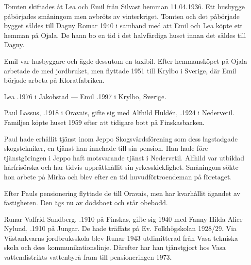 Tomten skiftades åt Lea och Emil från Silvast hemman 11.04.1936. Ett husbygge påbörjades småningom men avbröts av vinterkriget. Tomten och det påbörjade bygget såldes till Dagny Romar 1940 i samband med att Emil och Lea köpte ett hemman på Ojala. De hann bo en tid i det halvfärdiga huset innan det såldes till Dagny.

Emil var husbyggare och ägde dessutom en taxibil. Efter hemmansköpet på Ojala arbetade de med jordbruket, men flyttade 1951 till Krylbo i Sverige, där Emil började arbeta på Kloratfabriken.

Lea .1976 i Jakobstad  ---  Emil .1997 i Krylbo, Sverige.






Paul Lassus, .1918 i Oravais, gifte sig med Alfhild Huldén, .1924 i Nedervetil. Familjen köpte huset 1959 efter att tidigare bott på Finskasbacken.

Paul hade erhållit tjänst inom Jeppo Skogsvårdsförening som dess lagstadgade skogstekniker, en tjänst han innehade till sin pension. Han hade före tjänstgöringen i Jeppo haft motsvarande tjänst i Nedervetil. Alfhild var utbildad hårfrisörska och har tidvis upprätthållit sin yrkesskicklighet. Småningom sökte hon arbete på Mirka och blev efter en tid huvudförtroendeman på företaget.

Efter Pauls pensionering flyttade de till Oravais, men har kvarhållit ägandet av fastigheten. Den ägs nu av dödsboet och står obebodd.
\begin{jhchildren}
  \item {}
  \item {}
  \item {}
  \item {}
\end{jhchildren}


Runar Valfrid Sandberg, .1910 på Finskas, gifte sig 1940 med Fanny Hilda Alice Nylund, .1910 på Jungar. De hade träffats på Ev. Folkhögskolan 1928/29. Via Västankvarns jordbruksskola blev Runar 1943 utdimitterad från Vasa tekniska skola och dess kommunikationslinje. Därefter har han tjänstgjort hos Vasa vattendistrikts vattenbyrå fram till pensioneringen 1973.

